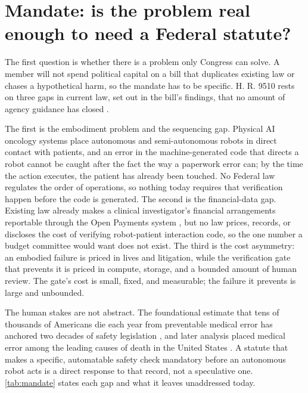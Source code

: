 \section{Mandate: is the problem real enough to need a Federal statute?}
\label{sec:mandate}

The first question is whether there is a problem only Congress can solve. A member
will not spend political capital on a bill that duplicates existing law or chases a
hypothetical harm, so the mandate has to be specific. H. R. 9510 rests on three gaps
in current law, set out in the bill's findings, that no amount of agency guidance has
closed \cite{Kawchak2026HR9510Bill}.

The first is the embodiment problem and the sequencing gap. Physical AI oncology
systems place autonomous and semi-autonomous robots in direct contact with patients,
and an error in the machine-generated code that directs a robot cannot be caught
after the fact the way a paperwork error can; by the time the action executes, the
patient has already been touched. No Federal law regulates the order of operations,
so nothing today requires that verification happen before the code is generated. The
second is the financial-data gap. Existing law already makes a clinical
investigator's financial arrangements reportable through the Open Payments system
\cite{openpayments}, but no law prices, records, or discloses the cost of verifying
robot-patient interaction code, so the one number a budget committee would want does
not exist. The third is the cost asymmetry: an embodied failure is priced in lives
and litigation, while the verification gate that prevents it is priced in compute,
storage, and a bounded amount of human review. The gate's cost is small, fixed, and
measurable; the failure it prevents is large and unbounded.

The human stakes are not abstract. The foundational estimate that tens of thousands
of Americans die each year from preventable medical error has anchored two decades
of safety legislation \cite{kohn2000toerr}, and later analysis placed medical error
among the leading causes of death in the United States \cite{makary2016medical}. A
statute that makes a specific, automatable safety check mandatory before an
autonomous robot acts is a direct response to that record, not a speculative one.
\autoref{tab:mandate} states each gap and what it leaves unaddressed today.


